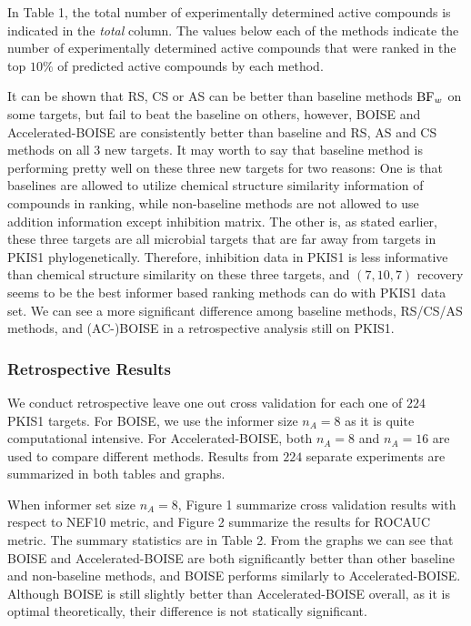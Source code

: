 \documentclass[12pt]{article}
\begin{document}
In Table 1, the total number of experimentally determined active compounds is indicated in the \textit{total} column. The values below each of the methods indicate the number of experimentally determined active compounds that were ranked in the top $10\%$ of predicted active compounds by each method. 

It can be shown that RS, CS or AS can be better than baseline methods ${\rm BF}_w$ on some targets, but fail to beat the baseline on others, however, BOISE and Accelerated-BOISE are consistently better than baseline and RS, AS and CS methods on all 3 new targets. It may worth to say that baseline method is performing pretty well on these three new targets for two reasons: One is that baselines are allowed to utilize chemical structure similarity information of compounds in ranking, while non-baseline methods are not allowed to use addition information except inhibition matrix. The other is, as stated earlier, these three targets are all microbial targets that are far away from targets in PKIS1 phylogenetically. Therefore, inhibition data in PKIS1 is less informative than chemical structure similarity on these three targets, and $(7,10,7)$ recovery seems to be the best informer based ranking methods can do with PKIS1 data set. We can see a more significant difference among baseline methods, RS/CS/AS methods, and (AC-)BOISE in a retrospective analysis still on PKIS1.

\subsubsection{Retrospective Results}
We conduct retrospective leave one out cross validation for each one of $224$ PKIS1 targets. For BOISE, we use the informer size $n_A = 8$ as it is quite computational intensive. For Accelerated-BOISE, both $n_A= 8$ and $n_A = 16$ are used to compare different methods. Results from $224$ separate experiments are summarized in both tables and graphs. 

When informer set size $n_A = 8$, Figure 1 summarize cross validation results with respect to NEF10 metric, and Figure 2 summarize the results for ROCAUC metric. The summary statistics are in Table 2. From the graphs we can see that BOISE and Accelerated-BOISE are both significantly better than other baseline and non-baseline methods, and BOISE performs similarly to Accelerated-BOISE. Although BOISE is still slightly better than Accelerated-BOISE overall, as it is optimal theoretically, their difference is not statically significant. 
\end{document}
